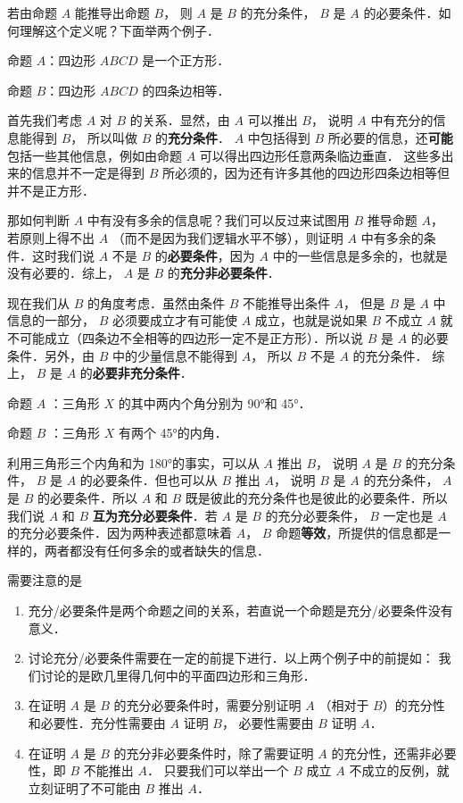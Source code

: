 
若由命题 $A$ 能推导出命题 $B$， 则 $A$ 是 $B$ 的充分条件， $B$ 是 $A$ 的必要条件．如何理解这个定义呢？下面举两个例子．

\begin{exam}{}
命题 $A$：四边形 $ABCD$ 是一个正方形．

命题 $B$：四边形 $ABCD$ 的四条边相等．

首先我们考虑 $A$ 对 $B$ 的关系．显然，由 $A$ 可以推出 $B$， 说明 $A$ 中有充分的信息能得到 $B$， 所以叫做 $B$ 的\textbf{充分条件}． $A$ 中包括得到 $B$ 所必要的信息，还\textbf{可能}包括一些其他信息，例如由命题 $A$ 可以得出四边形任意两条临边垂直． 这些多出来的信息并不一定是得到 $B$ 所必须的，因为还有许多其他的四边形四条边相等但并不是正方形．

那如何判断 $A$ 中有没有多余的信息呢？我们可以反过来试图用 $B$ 推导命题 $A$， 若原则上得不出 $A$ （而不是因为我们逻辑水平不够），则证明 $A$ 中有多余的条件．这时我们说 $A$ 不是 $B$ 的\textbf{必要条件}，因为 $A$ 中的一些信息是多余的，也就是没有必要的．综上， $A$ 是 $B$ 的\textbf{充分非必要条件}．

现在我们从 $B$ 的角度考虑．虽然由条件 $B$ 不能推导出条件 $A$， 但是 $B$ 是 $A$ 中信息的一部分， $B$ 必须要成立才有可能使 $A$ 成立，也就是说如果 $B$ 不成立 $A$ 就不可能成立（四条边不全相等的四边形一定不是正方形）．所以说 $B$ 是 $A$ 的必要条件．另外，由 $B$ 中的少量信息不能得到 $A$， 所以 $B$ 不是 $A$ 的充分条件． 综上， $B$ 是 $A$ 的\textbf{必要非充分条件}．
\end{exam}


\begin{exam}{}
命题 $A$ ：三角形 $X$ 的其中两内个角分别为 90°和 45°．

命题 $B$ ：三角形 $X$ 有两个 45°的内角．

利用三角形三个内角和为 180°的事实，可以从 $A$ 推出 $B$， 说明 $A$ 是 $B$ 的充分条件， $B$ 是 $A$ 的必要条件．但也可以从 $B$ 推出 $A$， 说明 $B$ 是 $A$ 的充分条件， $A$ 是 $B$ 的必要条件．所以 $A$ 和 $B$ 既是彼此的充分条件也是彼此的必要条件．所以我们说 $A$ 和 $B$ \textbf{互为充分必要条件}．若 $A$ 是 $B$ 的充分必要条件， $B$ 一定也是 $A$ 的充分必要条件．因为两种表述都意味着 $A$，  $B$ 命题\textbf{等效}，所提供的信息都是一样的，两者都没有任何多余的或者缺失的信息．
\end{exam}

需要注意的是 
\begin{enumerate}
\item 充分/必要条件是两个命题之间的关系，若直说一个命题是充分/必要条件没有意义．
\item 讨论充分/必要条件需要在一定的前提下进行．以上两个例子中的前提如： 我们讨论的是欧几里得几何中的平面四边形和三角形．
\item 在证明 $A$ 是 $B$ 的充分必要条件时，需要分别证明 $A$ （相对于 $B$）的充分性和必要性．充分性需要由 $A$ 证明 $B$， 必要性需要由 $B$ 证明 $A$． 
\item 在证明 $A$ 是 $B$ 的充分非必要条件时，除了需要证明 $A$ 的充分性，还需非必要性，即 $B$ 不能推出 $A$． 只要我们可以举出一个 $B$ 成立 $A$ 不成立的反例，就立刻证明了不可能由 $B$ 推出 $A$． 
\end{enumerate}
